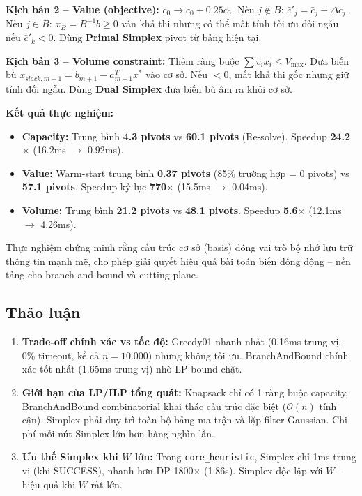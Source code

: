 \textbf{Kịch bản 2 -- Value (objective):} $c_0 \to c_0 + 0.25 c_0$. Nếu $j \notin B$: $\bar{c}'_j = \bar{c}_j + \Delta c_j$. Nếu $j\in B$: $x_B = B^{-1}b\ge 0$ vẫn khả thi nhưng có thể mất tính tối ưu đối ngẫu nếu $\bar{c}'_k < 0$. Dùng \textbf{Primal Simplex} pivot từ bảng hiện tại.

\textbf{Kịch bản 3 -- Volume constraint:} Thêm ràng buộc $\sum v_i x_i \le V_{\max}$. Đưa biến bù $x_{slack, m+1} = b_{m+1} - a_{m+1}^T x^*$ vào cơ sở. Nếu $<0$, mất khả thi gốc nhưng giữ tính đối ngẫu. Dùng \textbf{Dual Simplex} đưa biến bù âm ra khỏi cơ sở.

\textbf{Kết quả thực nghiệm:}
\begin{itemize}[leftmargin=*]
    \item \textbf{Capacity:} Trung bình \textbf{4.3 pivots} vs \textbf{60.1 pivots} (Re-solve). Speedup \textbf{24.2$\times$} (16.2ms $\to$ 0.92ms).
    \item \textbf{Value:} Warm-start trung bình \textbf{0.37 pivots} (85\% trường hợp = 0 pivots) vs \textbf{57.1 pivots}. Speedup kỷ lục \textbf{770$\times$} (15.5ms $\to$ 0.04ms).
    \item \textbf{Volume:} Trung bình \textbf{21.2 pivots} vs \textbf{48.1 pivots}. Speedup \textbf{5.6$\times$} (12.1ms $\to$ 4.26ms).
\end{itemize}

Thực nghiệm chứng minh rằng cấu trúc cơ sở (basis) đóng vai trò bộ nhớ lưu trữ thông tin mạnh mẽ, cho phép giải quyết hiệu quả bài toán biến động động -- nền tảng cho branch-and-bound và cutting plane.

\FloatBarrier
\subsection{Thảo luận}
\label{subsec:discussion}

\begin{enumerate}[leftmargin=*]
    \item \textbf{Trade-off chính xác vs tốc độ:} Greedy01 nhanh nhất (0.16ms trung vị, 0\% timeout, kể cả $n=10.000$) nhưng không tối ưu. BranchAndBound chính xác tốt nhất (1.65ms trung vị) nhờ LP bound chặt.

    \item \textbf{Giới hạn của LP/ILP tổng quát:} Knapsack chỉ có 1 ràng buộc capacity, BranchAndBound combinatorial khai thác cấu trúc đặc biệt ($\mathcal{O}(n)$ tính cận). Simplex phải duy trì toàn bộ bảng ma trận và lặp filter Gaussian. Chi phí mỗi nút Simplex lớn hơn hàng nghìn lần.

    \item \textbf{Ưu thế Simplex khi $W$ lớn:} Trong \texttt{core\_heuristic}, Simplex chỉ 1ms trung vị (khi SUCCESS), nhanh hơn DP 1800$\times$ (1.86s). Simplex độc lập với $W$ -- hiệu quả khi $W$ rất lớn.
\end{enumerate}

